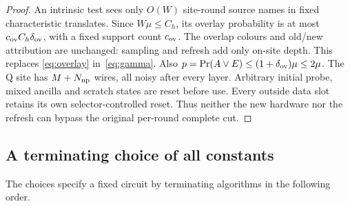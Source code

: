 \begin{proof}
An intrinsic test sees only \(O(W)\) site-round source names in fixed characteristic
translates. Since \(W\mu\le C_h\), its overlay probability is at most
\(c_{\rm ov}C_h\delta_{\rm ov}\), with a fixed support count
\(c_{\rm ov}\). The overlap colours and old/new attribution are
unchanged: sampling and refresh add only on-site depth. This replaces
\eqref{eq:overlay} in~\eqref{eq:gamma}. Also
\(p=\Pr(A\lor E)\le(1+\delta_{\rm ov})\mu\le2\mu\).
The \(\mathrm Q\) site has \(M+N_{\rm np}\) wires, all noisy after every layer.
Arbitrary initial probe, mixed ancilla and scratch states are reset before
use. Every outside data slot retains its own selector-controlled reset.
Thus neither the new hardware nor the refresh can bypass the original
per-round complete cut.
\end{proof}

\subsection{A terminating choice of all constants}\label{s:parameters}
The choices specify a fixed circuit by terminating algorithms in the following order.
